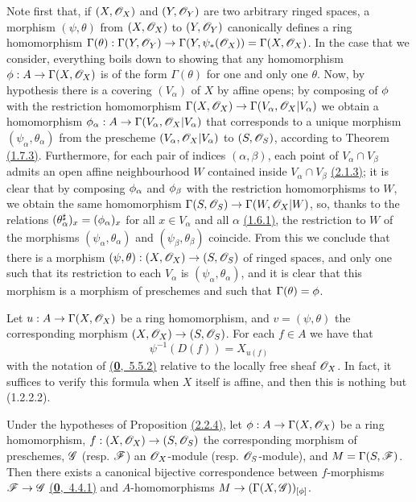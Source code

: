 Note first that, if $(X,\mathscr{O}_X)$ and $(Y,\mathscr{O}_Y)$ are two arbitrary ringed spaces,
a morphism $(\psi,\theta)$ from $(X,\mathscr{O}_X)$ to $(Y,\mathscr{O}_Y)$ canonically defines a ring
homomorphism
$\Gamma(\theta):\Gamma(Y,\mathscr{O}_Y)\to\Gamma(Y,\psi_*(\mathscr{O}_X))=\Gamma(X,\mathscr{O}_X)$.
In the case that we consider, everything boils down to showing that any
homomorphism $\phi:A\to\Gamma(X,\mathscr{O}_X)$ is of the form $\Gamma(\theta)$
for one and only one $\theta$. Now, by hypothesis there is a covering
$(V_\alpha)$ of $X$ by affine opens; by composing of $\phi$ with the
restriction homomorphism $\Gamma(X,\mathscr{O}_X)\to\Gamma(V_\alpha,\mathscr{O}_X|V_\alpha)$ we
obtain a homomorphism $\phi_\alpha:A\to\Gamma(V_\alpha,\mathscr{O}_X|V_\alpha)$
that corresponds to a unique morphism $(\psi_\alpha,\theta_\alpha)$ from the
prescheme $(V_\alpha,\mathscr{O}_X|V_\alpha)$ to $(S,\mathscr{O}_S)$, according to Theorem \hyperref[thm-1.1.7.3]{(1.7.3)}.
Furthermore, for each pair of indices $(\alpha,\beta)$, each point of
$V_\alpha\cap V_\beta$ admits an open affine neighbourhood $W$ contained inside
$V_\alpha\cap V_\beta$ \hyperref[prop-1.2.1.3]{(2.1.3)}; it is clear that by composing
$\phi_\alpha$ and $\phi_\beta$ with the restriction homomorphisms to $W$,
we obtain the same homomorphism $\Gamma(S,\mathscr{O}_S)\to\Gamma(W,\mathscr{O}_X|W)$, so, thanks
to the relations $(\theta_\alpha^\sharp)_x=(\phi_\alpha)_x$ for all $x\in
V_\alpha$ and all $\alpha$ \hyperref[env-1.1.6.1]{(1.6.1)}, the restriction to $W$ of the morphisms
$(\psi_\alpha,\theta_\alpha)$ and $(\psi_\beta,\theta_\beta)$ coincide. From
this we conclude that there is a morphism
$(\psi,\theta):(X,\mathscr{O}_X)\to(S,\mathscr{O}_S)$ of ringed spaces, and only one such
that its restriction to each $V_\alpha$ is $(\psi_\alpha,\theta_\alpha)$, and it
is clear that this morphism is a morphism of preschemes and such that
$\Gamma(\theta)=\phi$.

Let $u:A\to\Gamma(X,\mathscr{O}_X)$ be a ring homomorphism, and $v=(\psi,\theta)$
the corresponding morphism $(X,\mathscr{O}_X)\to(S,\mathscr{O}_S)$. For each $f\in A$ we have
that
\[
  \psi^{-1}(D(f))=X_{u(f)}
  \tag{2.2.4.1}
\]
with the notation of \hyperref[env-0.5.5.2]{(\textbf{0},~5.5.2)} relative to the locally free sheaf
$\mathscr{O}_X$. In fact, it suffices to verify this formula when $X$ itself is affine,
and then this is nothing but (1.2.2.2).

\begin{prop}[2.2.5]
\label{prop-1.2.2.5}
Under the hypotheses of Proposition \hyperref[prop-1.2.2.4]{(2.2.4)}, let
$\phi:A\to\Gamma(X,\mathscr{O}_X)$ be a ring homomorphism,
$f:(X,\mathscr{O}_X)\to(S,\mathscr{O}_S)$ the corresponding morphism of preschemes,
$\mathscr{G}$ (resp. $\mathscr{F}$) an $\mathscr{O}_X$-module (resp. $\mathscr{O}_S$-module), and
$M=\Gamma(S,\mathscr{F})$. Then there exists a canonical bijective
correspondence between $f$-morphisms $\mathscr{F}\to\mathscr{G}$ \hyperref[env-0.4.4.1]{(\textbf{0},~4.4.1)} and
$A$-homomorphisms $M\to(\Gamma(X,\mathscr{G}))_{[\phi]}$.
\end{prop}

